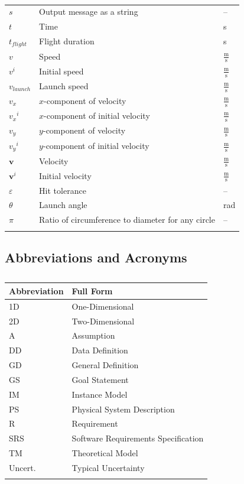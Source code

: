 \documentclass[12pt]{article}
\begin{document}
\begin{longtabu}{l X[l] l}
\\
$s$ & Output message as a string & --
\\
$t$ & Time & s
\\
${t_{flight}}$ & Flight duration & s
\\
$v$ & Speed & $\frac{\text{m}}{\text{s}}$
\\
${v^{i}}$ & Initial speed & $\frac{\text{m}}{\text{s}}$
\\
${v_{launch}}$ & Launch speed & $\frac{\text{m}}{\text{s}}$
\\
${v_{x}}$ & $x$-component of velocity & $\frac{\text{m}}{\text{s}}$
\\
${{v_{x}}^{i}}$ & $x$-component of initial velocity & $\frac{\text{m}}{\text{s}}$
\\
${v_{y}}$ & $y$-component of velocity & $\frac{\text{m}}{\text{s}}$
\\
${{v_{y}}^{i}}$ & $y$-component of initial velocity & $\frac{\text{m}}{\text{s}}$
\\
$\mathbf{v}$ & Velocity & $\frac{\text{m}}{\text{s}}$
\\
${\mathbf{v}^{i}}$ & Initial velocity & $\frac{\text{m}}{\text{s}}$
\\
$ε$ & Hit tolerance & --
\\
$θ$ & Launch angle & rad
\\
$π$ & Ratio of circumference to diameter for any circle & --
\\
\bottomrule
\caption{}
\label{Table:ToS}
\end{longtabu}
\subsection{Abbreviations and Acronyms}
\label{Sec:TAbbAcc}
\begin{longtable}{l l}
\toprule
\textbf{Abbreviation} & \textbf{Full Form}
\\
\midrule
\endhead
1D & One-Dimensional
\\
2D & Two-Dimensional
\\
A & Assumption
\\
DD & Data Definition
\\
GD & General Definition
\\
GS & Goal Statement
\\
IM & Instance Model
\\
PS & Physical System Description
\\
R & Requirement
\\
SRS & Software Requirements Specification
\\
TM & Theoretical Model
\\
Uncert. & Typical Uncertainty
\\
\bottomrule
\caption{}
\label{Table:TAbbAcc}
\end{longtable}
\end{document}
